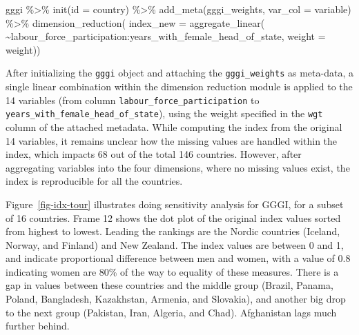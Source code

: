 \documentclass[
]{interact}
\newenvironment{Shaded}{\begin{snugshade}}{\end{snugshade}}
\newcommand{\AttributeTok}[1]{\textcolor[rgb]{0.40,0.45,0.13}{#1}}
\newcommand{\FunctionTok}[1]{\textcolor[rgb]{0.28,0.35,0.67}{#1}}
\newcommand{\NormalTok}[1]{\textcolor[rgb]{0.00,0.23,0.31}{#1}}
\newcommand{\SpecialCharTok}[1]{\textcolor[rgb]{0.37,0.37,0.37}{#1}}
\begin{document}
\begin{Shaded}
\begin{Highlighting}[]
\NormalTok{gggi }\SpecialCharTok{\%\textgreater{}\%} 
  \FunctionTok{init}\NormalTok{(}\AttributeTok{id =}\NormalTok{ country) }\SpecialCharTok{\%\textgreater{}\%}
  \FunctionTok{add\_meta}\NormalTok{(gggi\_weights, }\AttributeTok{var\_col =}\NormalTok{ variable) }\SpecialCharTok{\%\textgreater{}\%} 
  \FunctionTok{dimension\_reduction}\NormalTok{(}
    \AttributeTok{index\_new =} \FunctionTok{aggregate\_linear}\NormalTok{(}
      \SpecialCharTok{\textasciitilde{}}\NormalTok{labour\_force\_participation}\SpecialCharTok{:}\NormalTok{years\_with\_female\_head\_of\_state,}
      \AttributeTok{weight =}\NormalTok{ weight)) }
\end{Highlighting}
\end{Shaded}

After initializing the \texttt{gggi} object and attaching the
\texttt{gggi\_weights} as meta-data, a single linear combination within
the dimension reduction module is applied to the 14 variables (from
column \texttt{labour\_force\_participation} to
\texttt{years\_with\_female\_head\_of\_state}), using the weight
specified in the \texttt{wgt} column of the attached metadata. While
computing the index from the original 14 variables, it remains unclear
how the missing values are handled within the index, which impacts 68
out of the total 146 countries. However, after aggregating variables
into the four dimensions, where no missing values exist, the index is
reproducible for all the countries.

Figure~\ref{fig-idx-tour} illustrates doing sensitivity analysis for
GGGI, for a subset of 16 countries. Frame 12 shows the dot plot of the
original index values sorted from highest to lowest. Leading the
rankings are the Nordic countries (Iceland, Norway, and Finland) and New
Zealand. The index values are between 0 and 1, and indicate proportional
difference between men and women, with a value of 0.8 indicating women
are 80\% of the way to equality of these measures. There is a gap in
values between these countries and the middle group (Brazil, Panama,
Poland, Bangladesh, Kazakhstan, Armenia, and Slovakia), and another big
drop to the next group (Pakistan, Iran, Algeria, and Chad). Afghanistan
lags much further behind.
\end{document}
